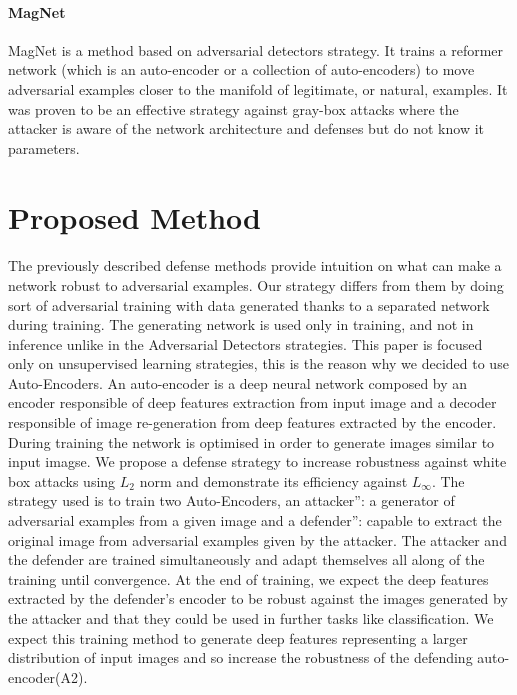 \documentclass[12pt]{article}
\begin{document}
\paragraph{MagNet}
MagNet \cite{meng_magnet:_2017} is a method based on adversarial detectors strategy. It trains a reformer network (which is an auto-encoder or a collection of auto-encoders) to move adversarial examples closer to the manifold of legitimate, or natural, examples. It was proven to be an effective strategy against gray-box attacks where the attacker is aware of the network architecture and defenses but do not know it parameters.


\section{Proposed Method}
\paragraph{}
The previously described defense methods provide intuition on what can make a network robust to adversarial examples. Our strategy differs from them by doing sort of adversarial training with data generated thanks to a separated network during training. The generating network is used only in training, and not in inference unlike in the Adversarial Detectors strategies. This paper is focused only on unsupervised learning strategies, this is the reason why we decided to use Auto-Encoders. An auto-encoder is a deep neural network composed by an encoder responsible of deep features extraction from input image and a decoder responsible of image re-generation from deep features extracted by the encoder. During training the network is optimised in order to generate images similar to input imagse.
We propose a defense strategy to increase robustness against white box attacks using $L_{2}$ norm and demonstrate its efficiency against $L_{\infty}$. The strategy used is to train two Auto-Encoders, an attacker”: a generator of adversarial examples from a given image and a defender”: capable to extract the original image from adversarial examples given by the attacker. The attacker and the defender are trained simultaneously and adapt themselves all along of the training until convergence. At the end of training, we expect the deep features extracted by the defender's encoder to be robust against the images generated by the attacker and that they could be used in further tasks like classification. We expect this training method to generate deep features representing a larger distribution of input images and so increase the robustness of the defending auto-encoder(A2).
\end{document}
